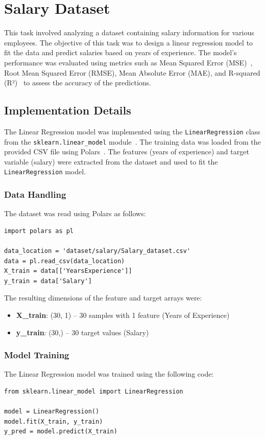 \section{Salary Dataset}
This task involved analyzing a dataset containing salary information for various employees. The objective of this task was to design a linear
regression model to fit the data and predict salaries based on years of experience. 
The model's performance was evaluated using metrics such as Mean Squared Error (MSE)~\cite{wiki_mse}, Root Mean Squared Error (RMSE), Mean Absolute Error (MAE), and R-squared (R²)~\cite{wiki_r_squared} to assess the accuracy of the predictions.

\subsection{Implementation Details}
The Linear Regression model was implemented using the \texttt{LinearRegression} class from the \texttt{sklearn.linear\_model} module~\cite{sklearn_linear_model}.
The training data was loaded from the provided CSV file using Polars~\cite{polars}. 
The features (years of experience) and target variable (salary) were extracted from the dataset and used to fit the \texttt{LinearRegression} model.

\subsubsection{Data Handling}
The dataset was read using Polars as follows:
\begin{verbatim}
import polars as pl

data_location = 'dataset/salary/Salary_dataset.csv'
data = pl.read_csv(data_location)
X_train = data[['YearsExperience']]
y_train = data['Salary']
\end{verbatim}

\noindent The resulting dimensions of the feature and target arrays were:
\begin{itemize}
    \item \textbf{X\_train}: (30, 1) -- 30 samples with 1 feature (Years of Experience)
    \item \textbf{y\_train}: (30,) -- 30 target values (Salary)
\end{itemize}

\newpage
\subsubsection{Model Training}
The Linear Regression model was trained using the following code:
\begin{verbatim}
from sklearn.linear_model import LinearRegression

model = LinearRegression()
model.fit(X_train, y_train)
y_pred = model.predict(X_train)
\end{verbatim}

